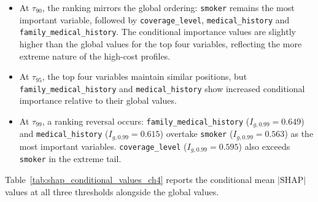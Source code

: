 \begin{itemize}
    \item At $\tau_{90}$, the ranking mirrors the global ordering:
    \texttt{smoker} remains the most important variable, followed by
    \texttt{coverage\_\allowbreak{}level}, \texttt{medical\_\allowbreak{}history} and
    \texttt{family\_medical\_\allowbreak{}history}. The conditional importance values
    are slightly higher than the global values for the top four
    variables, reflecting the more extreme nature of the high-cost
    profiles.

    \item At $\tau_{95}$, the top four variables maintain similar
    positions, but \texttt{family\_medical\_\allowbreak{}history} and
    \texttt{medical\_\allowbreak{}history} show increased conditional importance
    relative to their global values.

    \item At $\tau_{99}$, a ranking reversal occurs:
    \texttt{family\_medical\_\allowbreak{}history} ($I_{g,0.99} = 0.649$) and
    \texttt{medical\_\allowbreak{}history} ($I_{g,0.99} = 0.615$) overtake
    \texttt{smoker} ($I_{g,0.99} = 0.563$) as the most important
    variables. \texttt{coverage\_\allowbreak{}level} ($I_{g,0.99} = 0.595$) also
    exceeds \texttt{smoker} in the extreme tail.
\end{itemize}

\noindent
Table~\ref{tab:shap_conditional_values_ch4} reports the conditional
mean $|\text{SHAP}|$ values at all three thresholds alongside the global
values.

